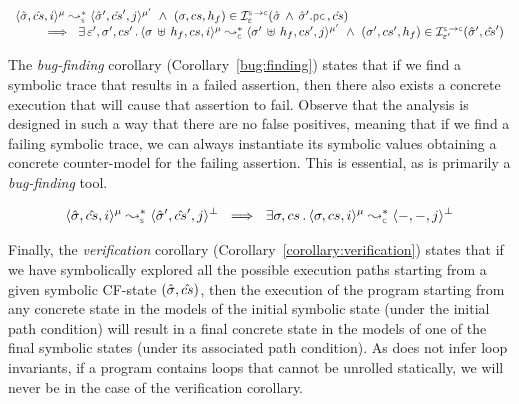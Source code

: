 \begin{theorem}[Soundiness]\label{teo:soundness:jsil:symb:exe}
$$
\begin{array}{l}
\transabssemrule{\sstate, \scs, i}{\sstate', \scs', j}{\mode}{\mode'}{\symbolic}  \ \wedge \ (\jstate, \cs, \heap_f) \in \interpret{\symbconc}{\senv}(\sstate \, \wedge \, \sstate'.\pcsel, \scs) \\ \quad \quad 
    \ \implies \ \exists \, \senv', \jstate', \cs' \, . \, 
        \transabssemrule{\jstate \dunion \heap_f, \cs, i}{\jstate' \dunion \heap_f, \cs', j}{\mode}{\mode'}{\concrete}
               \ \wedge \ (\jstate', \cs', \heap_f) \in \interpret{\symbconc}{\senv'}(\sstate', \scs')
\end{array}
$$
\end{theorem}

The \emph{bug-finding} corollary (Corollary~\ref{bug:finding}) states that if 
we find a symbolic trace that results in a failed assertion, 
then there also exists a concrete execution that will cause that assertion to fail.
Observe that the analysis is designed in such a way that there are no false positives, 
meaning that if we find a failing symbolic trace,
we can always instantiate its symbolic values obtaining a concrete counter-model for the 
failing assertion. This is essential, as \cosette is primarily a \emph{bug-finding} tool.


\begin{corollary}\label{bug:finding}
$$
\transabssemrule{\sstate, \scs, i}{\sstate', \scs', j}{\mode}{\bot}{\symbolic}  
      \ \implies \  \exists \jstate, \cs \, . \, \transabssemrule{\jstate, \cs, i}{-, -, j}{\mode}{\bot}{\concrete} 
$$
\end{corollary}

Finally, the \emph{verification} corollary (Corollary~\ref{corollary:verification})
states that if we have symbolically explored all the possible execution paths
starting from a given symbolic CF-state $(\hat{\sigma}, \hat{cs})$,  
then the execution of the program starting from  any concrete state in the models 
of the initial symbolic state (under the initial path condition) will result in a final concrete state
in the models of one of the final symbolic states (under its associated path condition).  
As \cosette does not infer loop invariants, if a \jsil program contains loops that cannot be 
unrolled statically, we will never be in the case of the verification corollary. 

